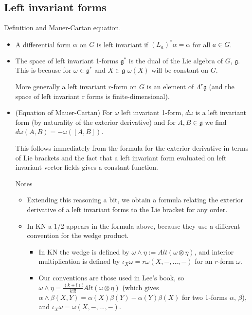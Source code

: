\documentclass{report}
\theoremstyle{definition}
\begin{document}
\subsection{Left invariant forms}

Definition and Mauer-Cartan equation.

\begin{itemize}
    \item A differential form $\alpha$ on $G$ is left invariant if $(L_a)^*\alpha=\alpha$ for all $a\in G$.
    \item The space of left invariant 1-forms $\mathfrak{g}^*$ is the dual of the Lie algebra of $G$, $\mathfrak{g}$. This is because for $\omega\in\mathfrak{g}^*$ and $X\in\mathfrak{g}$ $\omega(X)$ will be constant on $G$.

    More generally a left invariant $r$-form on $G$ is an element of $\Lambda^r\mathfrak{g}$ (and the space of left invariant r forms is finite-dimensional).
    \item (Equation of Mauer-Cartan) For $\omega$ left invariant 1-form, $d\omega$ is a left invariant form (by naturality of the exterior derivative) and for $A,B\in\mathfrak{g}$ we find $d\omega(A,B)=-\omega([A,B])$.

    This follows immediately from the formula for the exterior derivative in terms of Lie brackets and the fact that a left invariant form evaluated on left invariant vector fields gives a constant function.

    Notes
    \begin{itemize}
        \item Extending this reasoning a bit, we obtain a formula relating the exterior derivative of a left invariant forms to the Lie bracket for any order.
        \item In KN a $1/2$ appears in the formula above, because they use a different convention for the wedge product.
        \begin{itemize}
            \item In KN the wedge is defined by $\omega\wedge\eta:=Alt(\omega\otimes\eta)$, and interior multiplication is defined by $\iota_X\omega=r\omega(X,-,...,-)$ for an $r$-form $\omega$.
            \item Our conventions are those used in Lee's book, so $\omega\wedge\eta=\frac{(k+l)!}{k!l!}Alt(\omega\otimes\eta)$ (which gives $\alpha\wedge\beta(X,Y)=\alpha(X)\beta(Y)-\alpha(Y)\beta(X)$ for two 1-forms $\alpha$, $\beta$), and $\iota_X\omega=\omega(X,-,...,-)$.


\end{itemize}
\end{itemize}
\end{itemize}
\end{document}
